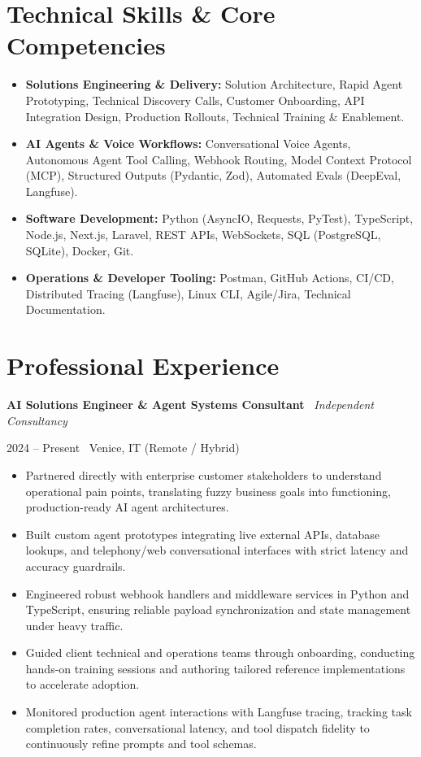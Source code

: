 \documentclass[a4paper,10pt]{article}
\newcommand{\role}[4]{%
  \vspace{2pt}\noindent
  \begin{minipage}[t]{0.70\textwidth}\raggedright\textbf{#1} \textbullet\ \textit{#3}\end{minipage}%
  \hfill
  \begin{minipage}[t]{0.28\textwidth}\raggedleft\footnotesize\color{gray}#2 \textbullet\ #4\end{minipage}%
  \vspace{1pt}%
}
\begin{document}
\section{Technical Skills \& Core Competencies}
\begin{itemize}[leftmargin=1.2em, itemsep=2pt]
  \item \textbf{Solutions Engineering \& Delivery:} Solution Architecture, Rapid Agent Prototyping, Technical Discovery Calls, Customer Onboarding, API Integration Design, Production Rollouts, Technical Training \& Enablement.
  \item \textbf{AI Agents \& Voice Workflows:} Conversational Voice Agents, Autonomous Agent Tool Calling, Webhook Routing, Model Context Protocol (MCP), Structured Outputs (Pydantic, Zod), Automated Evals (DeepEval, Langfuse).
  \item \textbf{Software Development:} Python (AsyncIO, Requests, PyTest), TypeScript, Node.js, Next.js, Laravel, REST APIs, WebSockets, SQL (PostgreSQL, SQLite), Docker, Git.
  \item \textbf{Operations \& Developer Tooling:} Postman, GitHub Actions, CI/CD, Distributed Tracing (Langfuse), Linux CLI, Agile/Jira, Technical Documentation.
\end{itemize}

\section{Professional Experience}

\role{AI Solutions Engineer \& Agent Systems Consultant}{2024 -- Present}{Independent Consultancy}{Venice, IT (Remote / Hybrid)}
\begin{itemize}
  \item Partnered directly with enterprise customer stakeholders to understand operational pain points, translating fuzzy business goals into functioning, production-ready AI agent architectures.
  \item Built custom agent prototypes integrating live external APIs, database lookups, and telephony/web conversational interfaces with strict latency and accuracy guardrails.
  \item Engineered robust webhook handlers and middleware services in Python and TypeScript, ensuring reliable payload synchronization and state management under heavy traffic.
  \item Guided client technical and operations teams through onboarding, conducting hands-on training sessions and authoring tailored reference implementations to accelerate adoption.
  \item Monitored production agent interactions with Langfuse tracing, tracking task completion rates, conversational latency, and tool dispatch fidelity to continuously refine prompts and tool schemas.
\end{itemize}
\end{document}
